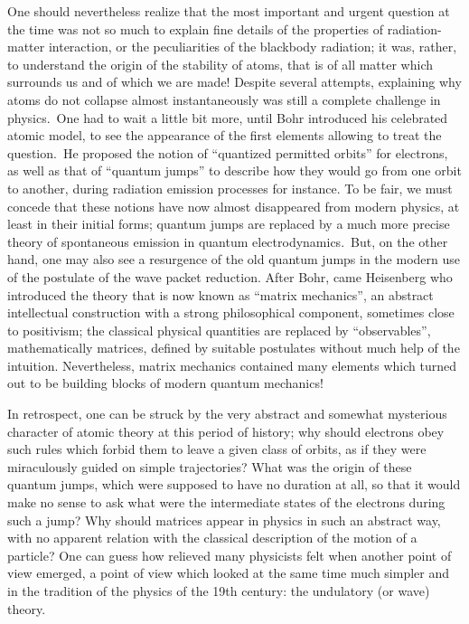 \documentclass[12pt,onecolumn]{article}%
\begin{document}
One should nevertheless realize that the most important and urgent question at
the time was not so much to explain fine details of the properties of
radiation-matter interaction, or the peculiarities of the blackbody radiation;
it was, rather, to understand the origin of the stability of atoms, that is of
all matter which surrounds us and of which we are made! Despite several
attempts, explaining why atoms do not collapse almost instantaneously was
still a complete challenge in physics.\ One had to wait a little bit more,
until Bohr introduced his celebrated atomic model, to see the appearance of
the first elements allowing to treat the question.\ He proposed the notion of
``quantized permitted orbits'' for electrons, as well as that of ``quantum
jumps'' to describe how they would go from one orbit to another, during
radiation emission processes for instance. To be fair, we must concede that
these notions have now almost disappeared from modern physics, at least in
their initial forms; quantum jumps are replaced by a much more precise theory
of spontaneous emission in quantum electrodynamics.\ But, on the other hand,
one may also see a resurgence of the old quantum jumps in the modern use of
the postulate of the wave packet reduction. After Bohr, came Heisenberg who
introduced the theory that is now known as ``matrix mechanics'', an abstract
intellectual construction with a strong philosophical component, sometimes
close to positivism; the classical physical quantities are replaced by
``observables'', mathematically matrices, defined by suitable postulates
without much help of the intuition. Nevertheless, matrix mechanics contained
many elements which turned out to be building blocks of modern quantum mechanics!

In retrospect, one can be struck by the very abstract and somewhat mysterious
character of atomic theory at this period of history; why should electrons
obey such rules which forbid them to leave a given class of orbits, as if they
were miraculously guided on simple trajectories? What was the origin of these
quantum jumps, which were supposed to have no duration at all, so that it
would make no sense to ask what were the intermediate states of the electrons
during such a jump? Why should matrices appear in physics in such an abstract
way, with no apparent relation with the classical description of the motion of
a particle? One can guess how relieved many physicists felt when another point
of view emerged, a point of view which looked at the same time much simpler
and in the tradition of the physics of the 19th century: the undulatory (or
wave) theory.
\end{document}
